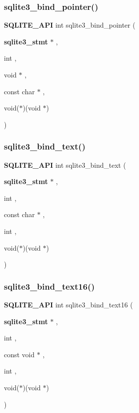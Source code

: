 \subsubsection{sqlite3\_bind\_pointer()}
{\footnotesize\ttfamily \textbf{ S\+Q\+L\+I\+T\+E\+\_\+\+A\+PI} int sqlite3\+\_\+bind\+\_\+pointer (\begin{DoxyParamCaption}\item[{\textbf{ sqlite3\+\_\+stmt} $\ast$}]{,  }\item[{int}]{,  }\item[{void $\ast$}]{,  }\item[{const char $\ast$}]{,  }\item[{void($\ast$)(void $\ast$)}]{ }\end{DoxyParamCaption})}

\mbox{\label{sqlite3_8h_a7f416198db2464a6c96a4ef679d19b1f}} 
\subsubsection{sqlite3\_bind\_text()}
{\footnotesize\ttfamily \textbf{ S\+Q\+L\+I\+T\+E\+\_\+\+A\+PI} int sqlite3\+\_\+bind\+\_\+text (\begin{DoxyParamCaption}\item[{\textbf{ sqlite3\+\_\+stmt} $\ast$}]{,  }\item[{int}]{,  }\item[{const char $\ast$}]{,  }\item[{int}]{,  }\item[{void($\ast$)(void $\ast$)}]{ }\end{DoxyParamCaption})}

\mbox{\label{sqlite3_8h_a7d78ae53b3dc77824595fa3a1abb5c79}} 
\subsubsection{sqlite3\_bind\_text16()}
{\footnotesize\ttfamily \textbf{ S\+Q\+L\+I\+T\+E\+\_\+\+A\+PI} int sqlite3\+\_\+bind\+\_\+text16 (\begin{DoxyParamCaption}\item[{\textbf{ sqlite3\+\_\+stmt} $\ast$}]{,  }\item[{int}]{,  }\item[{const void $\ast$}]{,  }\item[{int}]{,  }\item[{void($\ast$)(void $\ast$)}]{ }\end{DoxyParamCaption})}


